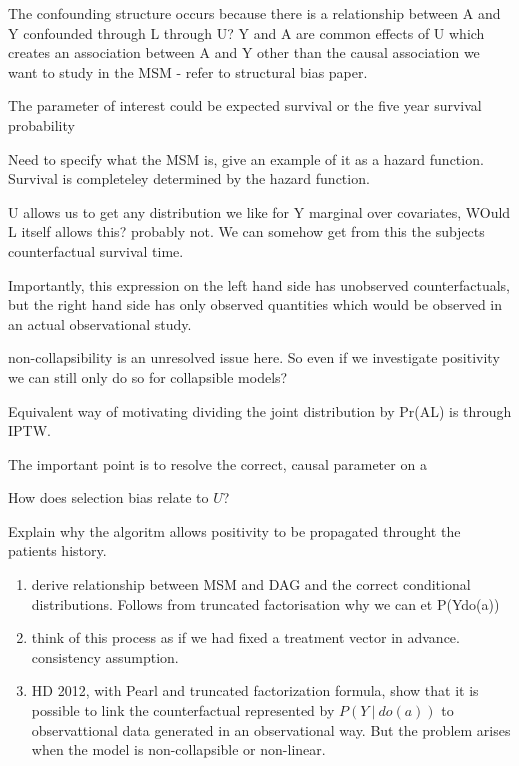 \documentclass[11pt]{article}
\begin{document}
The confounding structure occurs because there is a relationship between
A and Y confounded through L through U? Y and A are common effects of U
which creates an association between A and Y other than the causal
association we want to study in the MSM - refer to structural bias
paper.

The parameter of interest could be expected survival or the five year
survival probability

Need to specify what the MSM is, give an example of it as a hazard
function. Survival is completeley determined by the hazard function.

U allows us to get any distribution we like for Y marginal over
covariates, WOuld L itself allows this? probably not. We can somehow get
from this the subjects counterfactual survival time.

Importantly, this expression on the left hand side has unobserved
counterfactuals, but the right hand side has only observed quantities
which would be observed in an actual observational study.

non-collapsibility is an unresolved issue here. So even if we
investigate positivity we can still only do so for collapsible models?

Equivalent way of motivating dividing the joint distribution by
Pr(A\textbar{}L) is through IPTW.

The important point is to resolve the correct, causal parameter on a

How does selection bias relate to \(U\)?

Explain why the algoritm allows positivity to be propagated throught the
patients history.

\begin{enumerate}
\def\labelenumi{\arabic{enumi}.}
\item
  derive relationship between MSM and DAG and the correct conditional
  distributions. Follows from truncated factorisation why we can et
  P(Y\textbar{}do(a))
\item
  think of this process as if we had fixed a treatment vector in
  advance. consistency assumption.
\item
  HD 2012, with Pearl and truncated factorization formula, show that it
  is possible to link the counterfactual represented by
  \(P(Y\ |\ do(a))\) to observattional data generated in an
  observational way. But the problem arises when the model is
  non-collapsible or non-linear.
\end{enumerate}
\end{document}
